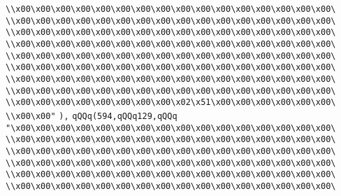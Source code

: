 \verb|\\x00\x00\x00\x00\x00\x00\x00\x00\x00\x00\x00\x00\x00\x00\x00\x00\|\newline
\verb|\\x00\x00\x00\x00\x00\x00\x00\x00\x00\x00\x00\x00\x00\x00\x00\x00\|\newline
\verb|\\x00\x00\x00\x00\x00\x00\x00\x00\x00\x00\x00\x00\x00\x00\x00\x00\|\newline
\verb|\\x00\x00\x00\x00\x00\x00\x00\x00\x00\x00\x00\x00\x00\x00\x00\x00\|\newline
\verb|\\x00\x00\x00\x00\x00\x00\x00\x00\x00\x00\x00\x00\x00\x00\x00\x00\|\newline
\verb|\\x00\x00\x00\x00\x00\x00\x00\x00\x00\x00\x00\x00\x00\x00\x00\x00\|\newline
\verb|\\x00\x00\x00\x00\x00\x00\x00\x00\x00\x00\x00\x00\x00\x00\x00\x00\|\newline
\verb|\\x00\x00\x00\x00\x00\x00\x00\x00\x00\x00\x00\x00\x00\x00\x00\x00\|\newline
\verb|\\x00\x00\x00\x00\x00\x00\x00\x00\x02\x51\x00\x00\x00\x00\x00\x00\|\newline
\verb|\\x00\x00"|\newline
\verb|),|\newline
\verb|qQQq(594,qQQq129,qQQq|\newline
\verb|"\x00\x00\x00\x00\x00\x00\x00\x00\x00\x00\x00\x00\x00\x00\x00\x00\|\newline
\verb|\\x00\x00\x00\x00\x00\x00\x00\x00\x00\x00\x00\x00\x00\x00\x00\x00\|\newline
\verb|\\x00\x00\x00\x00\x00\x00\x00\x00\x00\x00\x00\x00\x00\x00\x00\x00\|\newline
\verb|\\x00\x00\x00\x00\x00\x00\x00\x00\x00\x00\x00\x00\x00\x00\x00\x00\|\newline
\verb|\\x00\x00\x00\x00\x00\x00\x00\x00\x00\x00\x00\x00\x00\x00\x00\x00\|\newline
\verb|\\x00\x00\x00\x00\x00\x00\x00\x00\x00\x00\x00\x00\x00\x00\x00\x00\|\newline
